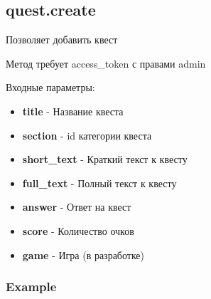 \subsection{quest.create}
Позволяет добавить квест

Метод требует access\_token с правами admin

Входные параметры:
\begin{itemize}
  \item \textbf{title} - Название квеста
  \item \textbf{section} - id категории квеста
  \item \textbf{short\_text} - Краткий текст к квесту
  \item \textbf{full\_text} - Полный текст к квесту
  \item \textbf{answer} - Ответ на квест
  \item \textbf{score} - Количество очков
  \item \textbf{game} - Игра (в разработке)
\end{itemize}

\subsubsection{Example}
\begin{Verbatim}[frame=single]

\end{Verbatim}